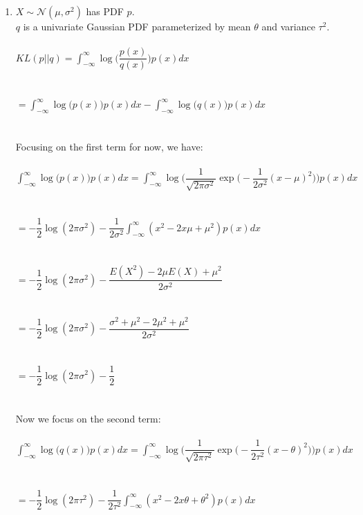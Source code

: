 \documentclass[submit]{harvardml}
\newcommand{\N}{\mathcal{N}}
\theoremstyle{plain}
\begin{document}
\begin{enumerate}[label=2.\arabic*.]
\item $X\sim\N(\mu,\sigma^2)$ has PDF $p$.\\
$q$ is a univariate Gaussian PDF parameterized by mean $\theta$ and variance $\tau^2$.\\\\
$KL(p||q)=\displaystyle\int_{-\infty}^\infty\log\bigg(\dfrac{p(x)}{q(x)}\bigg)p(x)dx$\\\\\\
$=\displaystyle\int_{-\infty}^\infty\log\big(p(x)\big)p(x)dx-\displaystyle\int_{-\infty}^\infty\log\big(q(x)\big)p(x)dx$\\\\\\
Focusing on the first term for now, we have:\\\\
$\displaystyle\int_{-\infty}^\infty\log\big(p(x)\big)p(x)dx=\displaystyle\int_{-\infty}^\infty\log\Bigg(\dfrac{1}{\sqrt{2\pi\sigma^2}}\exp\bigg(-\dfrac{1}{2\sigma^2}(x-\mu)^2\bigg)\Bigg)p(x)dx$\\\\\\
$=-\dfrac{1}{2}\log(2\pi\sigma^2)-\dfrac{1}{2\sigma^2}\displaystyle\int_{-\infty}^\infty(x^2-2x\mu+\mu^2)p(x)dx$\\\\\\
$=-\dfrac{1}{2}\log(2\pi\sigma^2)-\dfrac{E(X^2)-2\mu E(X)+\mu^2}{2\sigma^2}$\\\\\\
$=-\dfrac{1}{2}\log(2\pi\sigma^2)-\dfrac{\sigma^2+\mu^2-2\mu^2+\mu^2}{2\sigma^2}$\\\\\\
$=-\dfrac{1}{2}\log(2\pi\sigma^2)-\dfrac{1}{2}$\\\\\\
Now we focus on the second term:\\\\
$\displaystyle\int_{-\infty}^\infty\log\big(q(x)\big)p(x)dx=\displaystyle\int_{-\infty}^\infty\log\Bigg(\dfrac{1}{\sqrt{2\pi\tau^2}}\exp\bigg(-\dfrac{1}{2\tau^2}(x-\theta)^2\bigg)\Bigg)p(x)dx$\\\\\\
$=-\dfrac{1}{2}\log(2\pi\tau^2)-\dfrac{1}{2\tau^2}\displaystyle\int_{-\infty}^\infty(x^2-2x\theta+\theta^2)p(x)dx$\\\\\\

\end{enumerate}
\end{document}
